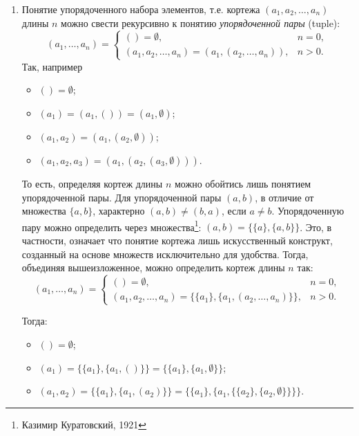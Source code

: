 \begin{enumerate}
    \item Понятие упорядоченного набора элементов, т.е. кортежа $(a_1,a_2,\ldots,a_n)$ длины $n$ можно свести рекурсивно к понятию \emph{упорядоченной пары} (tuple):
    \[
        (a_1,\ldots,a_n)=
        \begin{cases}
            ()=\emptyset, &n=0,\\
            (a_1,a_2,\ldots,a_n)=(a_1,(a_2,\ldots,a_n)), &n>0.
        \end{cases}
    \]
    Так, например 
    \begin{itemize}
        \item $()=\emptyset$; 
        \item $(a_1)=(a_1,())=(a_1,\emptyset)$;
        \item $(a_1,a_2)=(a_1,(a_2,\emptyset))$;
        \item $(a_1,a_2,a_3)=(a_1,(a_2,(a_3,\emptyset)))$.
    \end{itemize}
    
    То есть, определяя кортеж длины $n$ можно обойтись лишь понятием упорядоченной пары. Для упорядоченной пары $(a,b)$, в отличие от множества $\{a,b\}$, характерно $(a,b)\neq(b,a)$, если $a\neq b$. Упорядоченную пару можно определить через множества\footnote{Казимир Куратовский, 1921}: $(a,b)=\{\{a\},\{a,b\}\}$. Это, в частности, означает что понятие кортежа лишь искусственный конструкт, созданный на основе множеств исключительно для удобства. Тогда, объединяя вышеизложенное, можно определить кортеж длины $n$ так:
    \[
        (a_1,\ldots,a_n)=
        \begin{cases}
            ()=\emptyset, &n=0,\\
            (a_1,a_2,\ldots,a_n)=\{\{a_1\},\{a_1, (a_2,\ldots,a_n)\}\}, &n>0.
        \end{cases}
    \]
    
    Тогда:
    \begin{itemize}
        \item $()=\emptyset$; 
        \item $(a_1)=\{\{a_1\},\{a_1,()\}\}=\{\{a_1\},\{a_1,\emptyset\}\}$;
        \item $(a_1,a_2)=\{\{a_1\},\{a_1,(a_2)\}\}=\{\{a_1\},\{a_1,\{\{a_2\},\{a_2,\emptyset\}\}\}\}$.        
    \end{itemize}


\end{enumerate}
